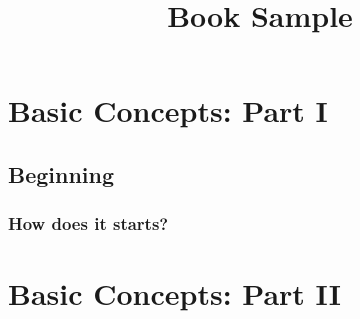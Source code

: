 \documentclass[twoside,a4paper,10pt]{book}
\title{Book Sample}
\begin{document}
\tableofcontents %

\part{Basic Concepts: Part I}
\chapter{Beginning}
\section{How does it starts?}

\part{Basic Concepts: Part II}
\end{document}

